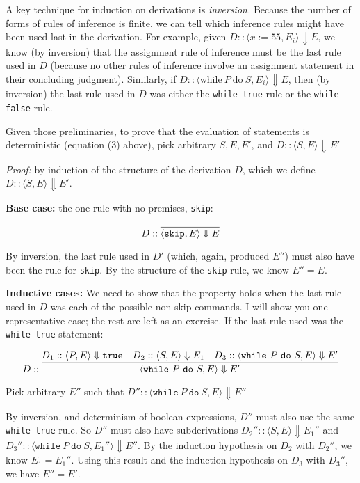 \documentclass[11pt]{article}
\begin{document}
\vspace{1ex}
A key technique for induction on derivations is \emph{inversion.} Because the number
of forms of rules of inference is finite, we can tell which inference rules
might have been used last in the derivation. For example, given $D :: \langle x
:= 55, E_i \rangle \Downarrow E$, we know (by inversion) that the assignment rule of
inference must be the last rule used in $D$ (because no other rules of inference
involve an assignment statement in their concluding judgment). Similarly, if $D
:: \langle \mbox{while}~P~\mbox{do}~S, E_i \rangle \Downarrow E$, then (by inversion) the last
rule used in $D$ was either the \texttt{while-true} rule or the \texttt{while-false} rule.

Given those preliminaries, to prove that the evaluation of statements is
deterministic (equation (3) above), pick arbitrary $S, E, E'$, and $D :: \langle
S, E \rangle \Downarrow E'$

\vspace{1ex}
\noindent \emph{Proof:} by induction of the structure of the derivation $D$, which we define $D :: \langle S, E\rangle \Downarrow E'$. 

\vspace{1ex}
\noindent \textbf{Base case:} the one rule with no premises, \texttt{skip}:

\begin{equation*}
D :: \infer{\langle \mathtt{skip}, E \rangle \Downarrow E}{}
\end{equation*}

By inversion, the last rule used in $D'$ (which, again, produced $E''$) must also
have been the rule for \texttt{skip}.  By the structure of the \texttt{skip}
rule, we know $E'' = E$.

\vspace{1ex} 
\noindent\textbf{Inductive cases:} We need to show that the property holds when
the last rule used in $D$ was each of the possible non-skip \WhileLang commands.  I
will show you one representative case; the rest are left as an exercise.  If the
last rule used was the \texttt{while-true} statement:

\begin{equation*}
D :: 
\infer{\langle \mathtt{while}~P~\mathtt{do}~S, E \rangle \Downarrow E'}
{D_1 :: \langle P, E  \rangle \Downarrow \mathtt{true} & D_2 :: \langle S, E \rangle \Downarrow E_1 &
D_3 :: \langle \mathtt{while}~P~\mathtt{do}~S, E \rangle \Downarrow E'}
\end{equation*}

\noindent Pick arbitrary $E''$ such that $D'' :: \langle \mathtt{while}~P~\mathtt{do}~S, E \rangle \Downarrow E''$

By inversion, and determinism of boolean expressions, $D''$ must also use
the same \texttt{while-true} rule.  So $D''$ must also have subderivations $D_2'' ::
\langle S, E \rangle \Downarrow E_1''$ and $D_3'' :: \langle \mathtt{while}~P~\mathtt{do}~S, E_1 ''
\rangle \Downarrow E''$.  By the induction hypothesis on $D_2$ with $D_2''$, we know
$E_1 = E_1''$.  Using this result and the induction hypothesis on $D_3$ with $D_3''$,
we have $E''= E'$.
\end{document}
